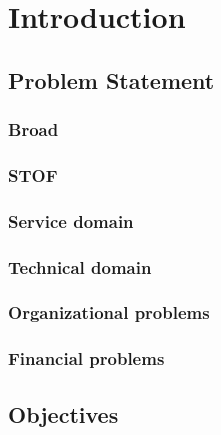 \documentclass[15pt]{article}
\begin{document}




\tableofcontents
\newpage



\section{Introduction}
  \subsection{Problem Statement}
  	\subsubsection{Broad}
  	\subsubsection{STOF}
    \subsubsection{Service domain}
    \subsubsection{Technical domain}
    \subsubsection{Organizational problems}
    \subsubsection{Financial problems}
  \subsection{Objectives}
\end{document}
